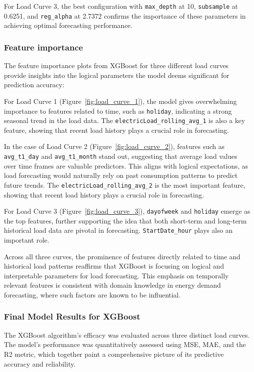 \documentclass{article} %
\begin{document}
For Load Curve 3, the best configuration with \texttt{max\_depth} at 10, \texttt{subsample} at 0.6251, and \texttt{reg\_alpha} at 2.7372 confirms the importance of these parameters in achieving optimal forecasting performance.

\subsubsection{Feature importance}

The feature importance plots from XGBoost for three different load curves provide insights into the logical parameters the model deems significant for prediction accuracy:

For Load Curve 1 (Figure~\ref{fig:load_curve_1}), the model gives overwhelming importance to features related to time, such as \texttt{holiday}, indicating a strong seasonal trend in the load data. The \texttt{electricLoad\_rolling\_avg\_1} is also a key feature, showing that recent load history plays a crucial role in forecasting.

In the case of Load Curve 2 (Figure~\ref{fig:load_curve_2}), features such as \texttt{avg\_t1\_day} and \texttt{avg\_t1\_month} stand out, suggesting that average load values over time frames are valuable predictors. This aligns with logical expectations, as load forecasting would naturally rely on past consumption patterns to predict future trends. The \texttt{electricLoad\_rolling\_avg\_2} is the most important feature, showing that recent load history plays a crucial role in forecasting.

For Load Curve 3 (Figure~\ref{fig:load_curve_3}), \texttt{dayofweek} and \texttt{holiday} emerge as the top features, further supporting the idea that both short-term and long-term historical load data are pivotal in forecasting. \texttt{StartDate\_hour} plays also an important role.

Across all three curves, the prominence of features directly related to time and historical load patterns reaffirms that XGBoost is focusing on logical and interpretable parameters for load forecasting. This emphasis on temporally relevant features is consistent with domain knowledge in energy demand forecasting, where such factors are known to be influential.

\subsubsection{Final Model Results for XGBoost}
The XGBoost algorithm's efficacy was evaluated across three distinct load curves. The model's performance was quantitatively assessed using \gls{MSE}, \gls{MAE}, and the \gls{R2} metric, which together paint a comprehensive picture of its predictive accuracy and reliability.
\end{document}
